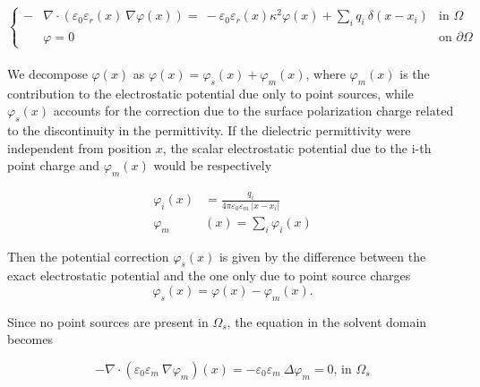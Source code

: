 \documentclass[11pt,a4paper]{article}
\begin{document}
\begin{equation}
    \left\{
    \begin{aligned}
     - & \nabla \cdot \left( \varepsilon_0 \varepsilon_r(x)\ 
    \nabla \varphi(x) \right)  =\ - \varepsilon_0 \varepsilon_r (x) \kappa^2 \varphi (x)
    + \sum_i q_i\ \delta(x-x_i) & \mbox{in } \Omega \\ 
    & \varphi = 0 & \mbox{on } \partial \Omega 
    \end{aligned}
    \right.
    \label{eq:pbe_prob_dir}
\end{equation}
\\
We decompose $\varphi (x)$ as $\varphi (x) = \varphi_s (x) + \varphi_m (x)$, where $\varphi_m (x)$ is the contribution
to the electrostatic potential due only to point sources, while $\varphi_s (x)$ accounts for the correction
due to the surface polarization charge related to the discontinuity in the permittivity. If the dielectric permittivity were independent from position $x$, the scalar electrostatic potential due to the i-th point charge and $\varphi_m (x)$ would be respectively

\begin{align*}
    \varphi_i (x) & = \frac{q_i}{4 \pi \varepsilon_0 \varepsilon_m\ |x-x_i|} \\
    \varphi_m & (x) = \sum_i \varphi_i (x)
\end{align*}

Then the potential correction $\varphi_s (x)$ is given by the difference between the exact electrostatic potential and the one only due to point source charges
\begin{equation}
    \varphi_s (x) = \varphi (x) - \varphi_m (x).
    \label{correct_pot}
\end{equation}

Since no point sources are present in $\Omega_s$, the equation in the solvent domain becomes

\begin{equation}
    -\nabla \cdot (\varepsilon_0 \varepsilon_m\ \nabla \varphi_m) (x) = - \varepsilon_0 \varepsilon_m\ \Delta \varphi_m = 0 \mbox{, in } \Omega_s
    \label{point_source_pot_in_solvent}
\end{equation}
\end{document}
